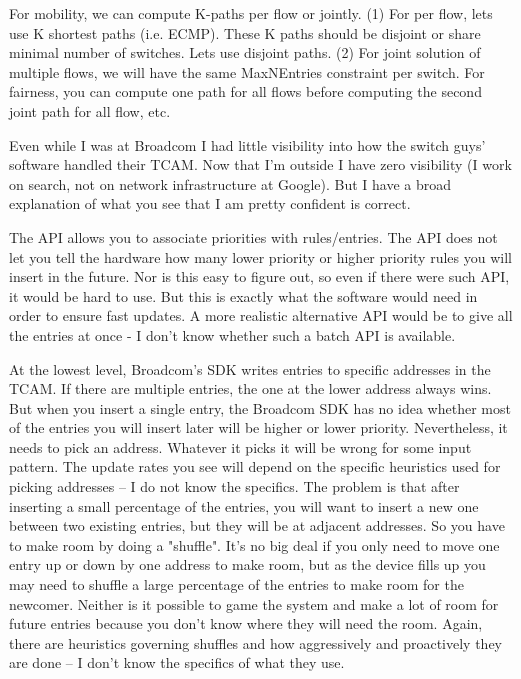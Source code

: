 
\iffalse
For mobility, we can compute K-paths per flow or jointly. (1) For per flow, lets
use K shortest paths (i.e. ECMP). These K paths should be disjoint or share
minimal number of switches. Lets use disjoint paths. (2) For joint solution of
multiple flows, we will have the same MaxNEntries constraint per switch. For
fairness, you can compute one path for all flows before computing the second
joint path for all flow, etc.  


Even while I was at Broadcom I had little visibility into how the switch guys'
software handled their TCAM. Now that I'm outside I have zero visibility (I work
on search, not on network infrastructure at Google). But I have a broad
explanation of what you see that I am pretty confident is correct. 
 
The API allows you to associate priorities with rules/entries. The API does not
let you tell the hardware how many lower priority or higher priority rules you
will insert in the future. Nor is this easy to figure out, so even if there were
such API, it would be hard to use. But this is exactly what the software would
need in order to ensure fast updates. A more realistic alternative API would be
to give all the entries at once - I don't know whether such a batch API is
available. 

At the lowest level, Broadcom's SDK writes entries to specific addresses in the
TCAM. If there are multiple entries, the one at the lower address always
wins. But when you insert a single entry, the Broadcom SDK has no idea whether
most of the entries you will insert later will be higher or lower
priority. Nevertheless, it needs to pick an address. Whatever it picks it will
be wrong for some input pattern. The update rates you see will depend on the
specific heuristics used for picking addresses -- I do not know the
specifics. The problem is that after inserting a small percentage of the
entries, you will want to insert a new one between two existing entries, but
they will be at adjacent addresses. So you have to make room by doing a
"shuffle". It's no big deal if you only need to move one entry up or down by one
address to make room, but as the device fills up you may need  to shuffle a
large percentage of the entries to make room for the newcomer. Neither is it
possible to game the system and make a lot of room for future entries because
you don't know where they will need the room. Again, there are heuristics
governing shuffles and how aggressively and proactively they are done -- I don't
know the specifics of what they use. 

